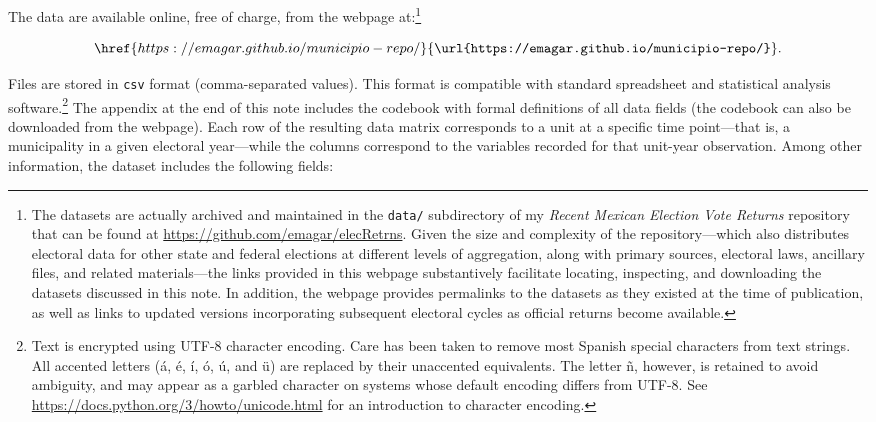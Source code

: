 \documentclass[letter,12pt]{article}
\begin{document}
The data are available online, free of charge, from the webpage at:\footnote{The datasets are actually archived and maintained in the \verb|data/| subdirectory of my \emph{Recent Mexican Election Vote Returns} repository that can be found at \url{https://github.com/emagar/elecRetrns}. Given the size and complexity of the repository---which also distributes electoral data for other state and federal elections at different levels of aggregation, along with primary sources, electoral laws, ancillary files, and related materials---the links provided in this webpage substantively facilitate locating, inspecting, and downloading the datasets discussed in this note. In addition, the webpage provides permalinks to the datasets as they existed at the time of publication, as well as links to updated versions incorporating subsequent electoral cycles as official returns become available.}

\begin{equation*}
\href{https://emagar.github.io/municipio-repo/}{\texttt{\url{https://emagar.github.io/municipio-repo/}}}.
\end{equation*}

\noindent Files are stored in \verb|csv| format (comma-separated values). This format is compatible with standard spreadsheet and statistical analysis software.\footnote{Text is encrypted using UTF-8 character encoding. Care has been taken to remove most Spanish special characters from text strings. All accented letters (\'a, \'e, \'i, \'o, \'u, and \"u) are replaced by their unaccented equivalents. The letter \~n, however, is retained to avoid ambiguity, and may appear as a garbled character on systems whose default encoding differs from UTF-8. See \url{https://docs.python.org/3/howto/unicode.html} for an introduction to character encoding.} The appendix at the end of this note includes the codebook with formal definitions of all data fields (the codebook can also be downloaded from the webpage). Each row of the resulting data matrix corresponds to a unit at a specific time point---that is, a municipality in a given electoral year---while the columns correspond to the variables recorded for that unit-year observation. Among other information, the dataset includes the following fields:
\end{document}
